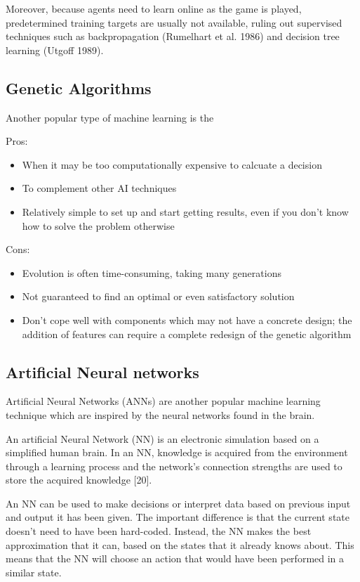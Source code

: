 \documentclass[a4paper,oneside]{report}
\begin{document}
Moreover, because agents need to learn online as the game is played, predetermined training targets are usually not available, ruling out supervised techniques such as backpropagation (Rumelhart et al. 1986) and decision tree learning (Utgoff 1989).

\subsection{Genetic Algorithms}

Another popular type of machine learning is the 

Pros:
\begin{itemize}
	\item When it may be too computationally expensive to calcuate a decision
	\item To complement other AI techniques
	\item Relatively simple to set up and start getting results, even if you don't know how to solve the problem otherwise
\end{itemize}

\noindent Cons:
\begin{itemize} 
	\item Evolution is often time-consuming, taking many generations
	\item Not guaranteed to find an optimal or even satisfactory solution
	\item Don't cope well with components which may not have a concrete design; the addition of features can require a complete redesign of the genetic algorithm
\end{itemize}

\subsection{Artificial Neural networks}

Artificial Neural Networks (ANNs) are another popular machine learning technique which are inspired by the neural networks found in the brain.

An artificial Neural Network (NN) is an electronic simulation based on a simplified human brain. In an NN, knowledge is acquired from the environment through a learning process and the network’s connection strengths are used to store the acquired knowledge [20].

An NN can be used to make decisions or interpret data based on previous input and output it has been given. The important difference is that the current state doesn’t need to have been hard-coded. Instead, the NN makes the best approximation that it can, based on the states that it already knows about. This means that the NN will choose an action that would have been performed in a similar state.
\end{document}
